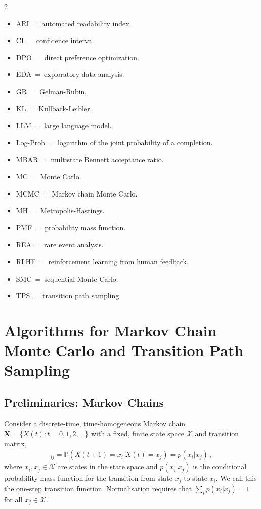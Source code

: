 \documentclass{article}
\begin{document}
\begin{multicols}{2}
    \begin{itemize}
        \item ARI~=~automated readability index.
        \item CI~=~confidence interval.
        \item DPO~=~direct preference optimization.
        \item EDA~=~exploratory data analysis.
        \item GR~=~Gelman-Rubin.
        \item KL~=~Kullback-Leibler.
        \item LLM~=~large language model.
        \item Log-Prob~=~logarithm of the joint probability of a completion.
        \item MBAR~=~multistate Bennett acceptance ratio.
        \item MC~=~Monte Carlo.
        \item MCMC~=~Markov chain Monte Carlo.
        \item MH~=~Metropolis-Hastings.
        \item PMF~=~probability mass function.
        \item REA~=~rare event analysis.
        \item RLHF~=~reinforcement learning from human feedback.
        \item SMC~=~sequential Monte Carlo.
        \item TPS~=~transition path sampling.
    \end{itemize}
\end{multicols}

\section{Algorithms for Markov Chain Monte Carlo and Transition Path Sampling}
\label{appendix:algorithms}

\subsection{Preliminaries: Markov Chains}

Consider a discrete-time, time-homogeneous Markov chain $\bm{X} = \lbrace X(t) : t = 0, 1, 2, \ldots \rbrace$ with a fixed, finite state space $\mathcal{X}$ and transition matrix,
\begin{align}
    [\mathbf{P}]_{i j} = \mathbb{P}(X(t+1) = x_i | X(t) = x_j) = p(x_i | x_j) \,,
    \label{eq:transition_matrix}
\end{align}
where $x_i, x_j \in \mathcal{X}$ are states in the state space and $p(x_i | x_j)$ is the conditional probability mass function for the transition from state $x_j$ to state $x_i$. We call this the
one-step transition function. Normalisation requires that $\sum_{i} p(x_i | x_j) = 1$ for all $x_j \in \mathcal{X}$.
\end{document}
